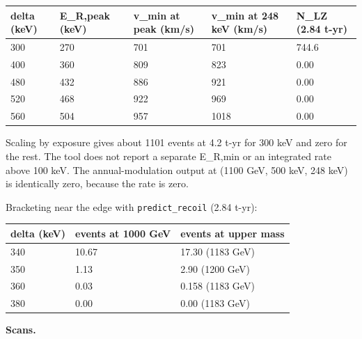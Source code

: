 \documentclass[11pt,a4paper]{article}
\begin{document}
\begin{longtable}{@{}p{}p{}p{}p{}p{}@{}}
\toprule
\textbf{delta (keV)} & \textbf{E\_R,peak (keV)} & \textbf{v\_min at peak (km/s)} & \textbf{v\_min at 248 keV (km/s)} & \textbf{N\_LZ (2.84 t-yr)} \\ \midrule \endhead
300 & 270 & 701 & 701 & 744.6 \\
400 & 360 & 809 & 823 & 0.00 \\
480 & 432 & 886 & 921 & 0.00 \\
520 & 468 & 922 & 969 & 0.00 \\
560 & 504 & 957 & 1018 & 0.00 \\
\bottomrule\end{longtable}
Scaling by exposure gives about 1101 events at 4.2 t-yr for 300 keV and zero for the rest. The tool does not report a separate E\_R,min or an integrated rate above 100 keV. The annual-modulation output at (1100 GeV, 500 keV, 248 keV) is identically zero, because the rate is zero.

Bracketing near the edge with \texttt{predict\_\allowbreak{}recoil} (2.84 t-yr):

\begin{longtable}{@{}p{}p{}p{}@{}}
\toprule
\textbf{delta (keV)} & \textbf{events at 1000 GeV} & \textbf{events at upper mass} \\ \midrule \endhead
340 & 10.67 & 17.30 (1183 GeV) \\
350 & 1.13 & 2.90 (1200 GeV) \\
360 & 0.03 & 0.158 (1183 GeV) \\
380 & 0.00 & 0.00 (1183 GeV) \\
\bottomrule\end{longtable}
\textbf{Scans.}
\end{document}
